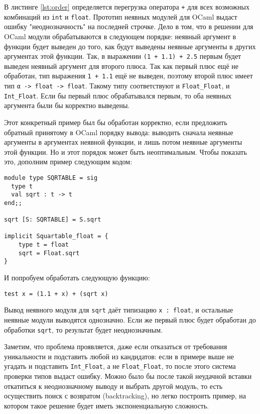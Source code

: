 \documentclass[../diploma.tex]{subfiles}
\begin{document}
В листинге \ref{lst:order} определяется перегрузка оператора \texttt{+} для всех возможных комбинаций из \texttt{int} и \texttt{float}. Прототип неявных модулей для OCaml выдаст ошибку "неоднозначность" на последней строчке. Дело в том, что в решении для OCaml модули обрабатываются в следующем порядке: неявный аргумент в функции будет выведен до того, как будут выведены неявные аргументы в других аргументах этой функции. Так, в выражении \texttt{(1 + 1.1) + 2.5} первым будет выведен неявный аргумент для второго плюса. Так как первый плюс ещё не обработан, тип выражения \texttt{1 + 1.1} ещё не выведен, поэтому второй плюс имеет тип \texttt{α -> float -> float}. Такому типу соответствуют и \texttt{Float_Float}, и \texttt{Int_Float}. Если бы первый плюс обрабатывался первым, то оба неявных аргумента были бы корректно выведены.

Этот конкретный пример был бы обработан корректно, если предложить обратный принятому в OCaml порядку вывода: выводить сначала неявные аргументы в аргументах неявной функции, и лишь потом неявные аргументы этой функции. Но и этот порядок может быть неоптимальным. Чтобы показать это, дополним пример следующим кодом:

\begin{verbatim}
module type SQRTABLE = sig
  type t
  val sqrt : t -> t
end;;

sqrt [S: SQRTABLE] = S.sqrt

implicit Squartable_float = {
    type t = float
    sqrt = Float.sqrt
}
\end{verbatim}

И попробуем обработать следующую функцию:

\begin{verbatim}
test x = (1.1 + x) + (sqrt x)
\end{verbatim}

Вывод неявного модуля для \texttt{sqrt} даёт типизацию \texttt{x : float}, и остальные неявные модули выводятся однозначно. Если же первый плюс будет обработан до обработки \texttt{sqrt}, то результат будет неоднозначным.

Заметим, что проблема проявляется, даже если отказаться от требования уникальности и подставить любой из кандидатов: если в примере выше не угадать и подставить \texttt{Int_Float}, а не \texttt{Float_Float}, то после этого система проверки типов выдаст ошибку. Можно было бы после такой неудачной вставки откатиться к неоднозначному выводу и выбрать другой модуль, то есть осуществить поиск с возвратом (backtracking), но легко построить пример, на котором такое решение будет иметь экспоненциальную сложность.
\end{document}

